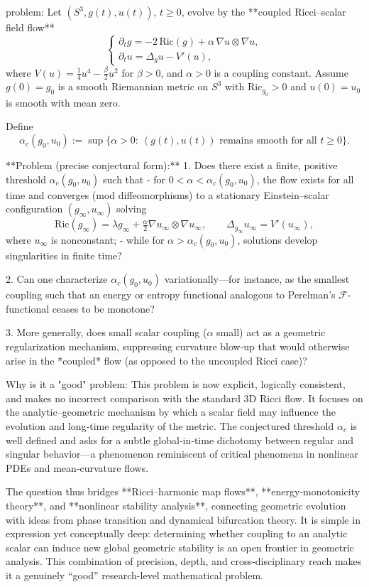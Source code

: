 problem:  
Let \((S^3,g(t),u(t))\), \(t\ge 0\), evolve by the **coupled Ricci–scalar field flow**
\[
\begin{cases}
\partial_t g = -2\,\mathrm{Ric}(g) + \alpha\,\nabla u \otimes \nabla u,\\[5pt]
\partial_t u = \Delta_g u - V'(u),
\end{cases}
\]
where \(V(u)=\tfrac{1}{4}u^4 - \tfrac{\beta}{2}u^2\) for \(\beta>0\), and \(\alpha>0\) is a coupling constant.  
Assume \(g(0)=g_0\) is a smooth Riemannian metric on \(S^3\) with \(\mathrm{Ric}_{g_0}>0\) and \(u(0)=u_0\) is smooth with mean zero.

Define
\[
\alpha_c(g_0,u_0):=\sup \{\alpha>0:\ (g(t),u(t))\text{ remains smooth for all }t\ge0\}.
\]

**Problem (precise conjectural form):**  
1.  Does there exist a finite, positive threshold \(\alpha_c(g_0,u_0)\) such that  
   - for \(0<\alpha<\alpha_c(g_0,u_0)\), the flow exists for all time and converges (mod diffeomorphisms) to a stationary Einstein–scalar configuration \((g_\infty,u_\infty)\) solving
     \[
     \mathrm{Ric}(g_\infty) = \lambda g_\infty + \tfrac{\alpha}{2}\nabla u_\infty\otimes\nabla u_\infty,\qquad
     \Delta_{g_\infty}u_\infty = V'(u_\infty),
     \]
     where \(u_\infty\) is nonconstant;
   - while for \(\alpha>\alpha_c(g_0,u_0)\), solutions develop singularities in finite time?  

2.  Can one characterize \(\alpha_c(g_0,u_0)\) variationally—for instance, as the smallest coupling such that an energy or entropy functional analogous to Perelman’s \( \mathcal{F}\)-functional ceases to be monotone?

3.  More generally, does small scalar coupling (\(\alpha\) small) act as a geometric regularization mechanism, suppressing curvature blow‑up that would otherwise arise in the *coupled* flow (as opposed to the uncoupled Ricci case)?

Why is it a "good" problem:  
This problem is now explicit, logically consistent, and makes no incorrect comparison with the standard 3D Ricci flow. It focuses on the analytic–geometric mechanism by which a scalar field may influence the evolution and long‑time regularity of the metric. The conjectured threshold \(\alpha_c\) is well defined and asks for a subtle global‑in‑time dichotomy between regular and singular behavior—a phenomenon reminiscent of critical phenomena in nonlinear PDEs and mean‑curvature flows.  

The question thus bridges **Ricci–harmonic map flows**, **energy‑monotonicity theory**, and **nonlinear stability analysis**, connecting geometric evolution with ideas from phase transition and dynamical bifurcation theory.  
It is simple in expression yet conceptually deep: determining whether coupling to an analytic scalar can induce new global geometric stability is an open frontier in geometric analysis. This combination of precision, depth, and cross‑disciplinary reach makes it a genuinely “good” research-level mathematical problem.